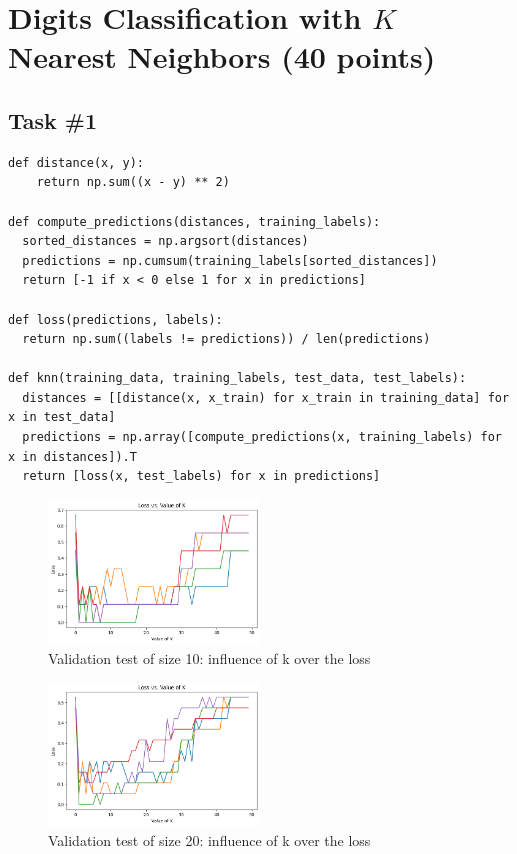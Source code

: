 \documentclass[a4paper,12pt]{article}
\begin{document}
\section{Digits Classification with $K$ Nearest Neighbors (40 points)}

\subsection{Task \#1}

\begin{lstlisting}
def distance(x, y):
    return np.sum((x - y) ** 2)

def compute_predictions(distances, training_labels):
  sorted_distances = np.argsort(distances)
  predictions = np.cumsum(training_labels[sorted_distances])
  return [-1 if x < 0 else 1 for x in predictions]

def loss(predictions, labels):
  return np.sum((labels != predictions)) / len(predictions)

def knn(training_data, training_labels, test_data, test_labels):
  distances = [[distance(x, x_train) for x_train in training_data] for x in test_data]
  predictions = np.array([compute_predictions(x, training_labels) for x in distances]).T
  return [loss(x, test_labels) for x in predictions]
\end{lstlisting}

\begin{figure}[htbp]
	\centering
	\includegraphics[width=0.5\textwidth]{1}
	\caption{Validation test of size 10: influence of k over the loss}
\end{figure}

\begin{figure}[htbp]
	\centering
	\includegraphics[width=0.5\textwidth]{2}
	\caption{Validation test of size 20: influence of k over the loss}
\end{figure}
\end{document}
